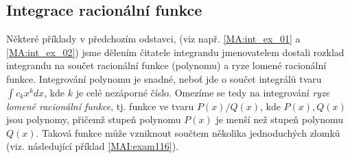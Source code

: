       

      

      

      
     
      

      

      
  
    \newpage
    \subsection{Integrace racionální funkce}
      Některé příklady v předchozím odstavci, (viz např. \ref{MA:int_ex_01} a 
      \ref{MA:int_ex_02}) jsme dělením čitatele integrandu jmenovatelem dostali rozklad
      integrandu na součet racionální funkce (polynomu) a ryze lomené racionální funkce.
      Integrování polynomu je snadné, neboť jde o součet integrálů tvaru $\int c_kx^k dx$, kde
      $k$ je celé nezáporné číslo. Omezíme se tedy na integrování \emph{ryze lomené racionální
      funkce},  tj. funkce ve tvaru $P(x)/Q(x)$, kde $P(x), Q(x)$ jsou polynomy, přičemž stupeň
      polynomu $P(x)$ je menší než stupeň polynomu $Q(x)$. Taková funkce může vzniknout součtem
      několika jednoduchých zlomků (viz. následující příklad \ref{MAI:exam116}).
      

